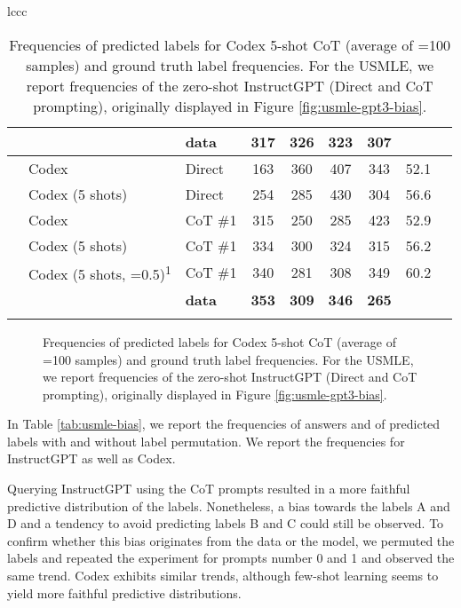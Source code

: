 \documentclass{article} \usepackage{iclr2022_conference,times}
\begin{document}
\begin{table}[h]
\begin{center}
{\begin{tabular}{lccc}
{\begin{table}[H]
\begin{center}
{\begin{tabular}{cllccccll}
\cmark  &  &  \bf data & \bf 317 & \bf 326 & \bf 323 & \bf 307 & \\
\midrule
\xmark  & Codex & Direct                        & {\color{niceblue}163} & {\color{nicered}360} & {\color{nicered}407} & {\color{nicered}343} & 52.1 &  \\
\xmark  & Codex (5 shots)  & Direct             & {\color{niceblue}254} & {\color{niceblue}285} & {\color{nicered}430} & {\color{nicered}304} & 56.6 &  \\
\xmark  & Codex & CoT \#1                       & 315 & {\color{niceblue}250} & 285 & {\color{nicered}423} & 52.9 &  \\
\xmark  & Codex  (5 shots) & CoT \#1            & 334 & 300 & 324 & {\color{nicered}315} & 56.2 &  \\
\xmark  & Codex (5 shots, =0.5)\textsuperscript{1}  & CoT \#1   & 340 & 281 & {\color{niceblue}308}  & {\color{nicered}349} & 60.2 &  \\
\xmark  &  & \bf data & \bf 353 &\bf  309 & \bf 346 & \bf 265 & \\
\bottomrule
\addlinespace[0.1cm]
\multicolumn{8}{l}{\small{
\textsuperscript{1}Averaged using  samples.
}}
\end{tabular} }
\end{center}
\end{table}

\begin{figure}[h]
    \centering
    \caption{Frequencies of predicted labels for Codex 5-shot CoT (average of =100 samples) and ground truth label frequencies. For the USMLE, we report frequencies of the zero-shot InstructGPT (Direct and CoT prompting), originally displayed in Figure \ref{fig:usmle-gpt3-bias}.}
    \label{fig:codex-bias}
\end{figure}

In Table \ref{tab:usmle-bias}, we report the frequencies of answers and of predicted labels with and without label permutation. We report the frequencies for InstructGPT as well as Codex.

Querying InstructGPT using the CoT prompts resulted in a more faithful predictive distribution of the labels. Nonetheless, a bias towards the labels A and D and a tendency to avoid predicting labels B and C could still be observed. To confirm whether this bias originates from the data or the model, we permuted the labels and repeated the experiment for prompts number 0 and 1 and observed the same trend. Codex exhibits similar trends, although few-shot learning seems to yield more faithful predictive distributions.

}
\end{tabular}}
\end{center}
\end{table}
\end{document}
